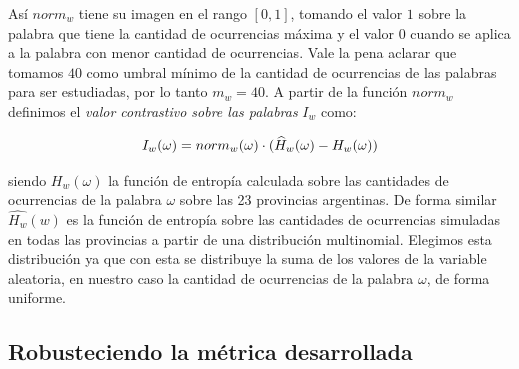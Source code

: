 




Así $norm_w$ tiene su imagen en el rango $[0,1]$, tomando el valor $1$ sobre la palabra que tiene la cantidad de ocurrencias máxima y el valor $0$ cuando se aplica a la palabra con menor cantidad de ocurrencias. Vale la pena aclarar que tomamos $40$ como umbral mínimo de la cantidad de ocurrencias de las palabras para ser estudiadas, por lo tanto $m_w = 40 $.
A partir de la función $norm_w$ definimos el \textit{valor contrastivo sobre las palabras} $I_w$ como:

\begin{equation}
I_w(\omega) = norm_{w}(\omega) \cdot (\widehat{H}_{w}(\omega) - H_{w}(\omega)) \\
\label{eq:iw}
\end{equation}

\noindent siendo $H_w(\omega)$ la función de entropía calculada sobre las cantidades de ocurrencias de la palabra $\omega$ sobre las 23 provincias argentinas. De forma similar $\widehat{H_w}(w)$ es la función de entropía sobre las cantidades de ocurrencias simuladas en todas las provincias a partir de una distribución multinomial. Elegimos esta distribución ya que con esta se distribuye la suma de los valores de la variable aleatoria, en nuestro caso la cantidad de ocurrencias de la palabra $\omega$, de forma uniforme.%

\subsection{Robusteciendo la métrica desarrollada}

